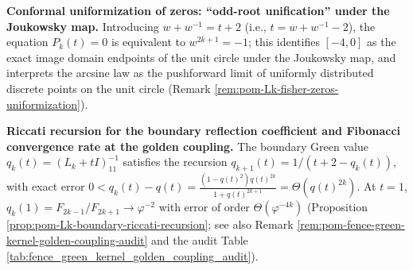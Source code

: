     \item \textbf{Conformal uniformization of zeros: ``odd-root unification'' under the Joukowsky map.}
    Introducing \(w+w^{-1}=t+2\) (i.e., \(t=w+w^{-1}-2\)), the equation \(P_k(t)=0\) is equivalent to \(w^{2k+1}=-1\);
    this identifies \([-4,0]\) as the exact image domain endpoints of the unit circle under the Joukowsky map, and interprets the arcsine law as the pushforward limit of uniformly distributed discrete points on the unit circle (Remark \ref{rem:pom-Lk-fisher-zeros-uniformization}).

    \item \textbf{Riccati recursion for the boundary reflection coefficient and Fibonacci convergence rate at the golden coupling.}
    The boundary Green value \(q_k(t)=(L_k+tI)^{-1}_{11}\) satisfies the recursion
    \(q_{k+1}(t)=1/(t+2-q_k(t))\), with exact error
    \(
    0<q_k(t)-q(t)=\frac{(1-q(t)^2)q(t)^{2k}}{1+q(t)^{2k+1}}=\Theta(q(t)^{2k})
    \).
    At \(t=1\),
    \(q_k(1)=F_{2k-1}/F_{2k+1}\to \varphi^{-2}\)
    with error of order \(\Theta(\varphi^{-4k})\) (Proposition \ref{prop:pom-Lk-boundary-riccati-recursion}; see also Remark \ref{rem:pom-fence-green-kernel-golden-coupling-audit} and the audit Table \ref{tab:fence_green_kernel_golden_coupling_audit}).


